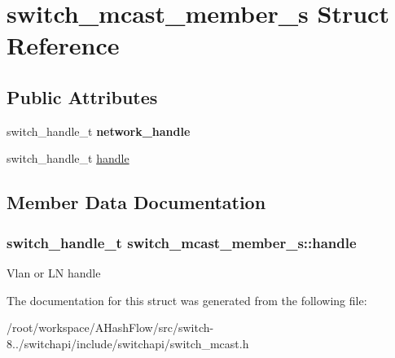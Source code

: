\hypertarget{structswitch__mcast__member__s}{\section{switch\+\_\+mcast\+\_\+member\+\_\+s Struct Reference}
\label{structswitch__mcast__member__s}
}
\subsection*{Public Attributes}
\begin{DoxyCompactItemize}
\item 
\hypertarget{structswitch__mcast__member__s_ad5a9193bfd96c54fdee76581b1edf212}{switch\+\_\+handle\+\_\+t {\bfseries network\+\_\+handle}}\label{structswitch__mcast__member__s_ad5a9193bfd96c54fdee76581b1edf212}

\item 
switch\+\_\+handle\+\_\+t \hyperlink{structswitch__mcast__member__s_aa89ac079f40b62ac348850d07759f861}{handle}
\end{DoxyCompactItemize}


\subsection{Member Data Documentation}
\hypertarget{structswitch__mcast__member__s_aa89ac079f40b62ac348850d07759f861}{
\subsubsection[{handle}]{\setlength{\rightskip}{0pt plus 5cm}switch\+\_\+handle\+\_\+t switch\+\_\+mcast\+\_\+member\+\_\+s\+::handle}}\label{structswitch__mcast__member__s_aa89ac079f40b62ac348850d07759f861}
Vlan or L\+N handle 

The documentation for this struct was generated from the following file\+:\begin{DoxyCompactItemize}
\item 
/root/workspace/\+A\+Hash\+Flow/src/switch-\/8../switchapi/include/switchapi/switch\+\_\+mcast.\+h\end{DoxyCompactItemize}
